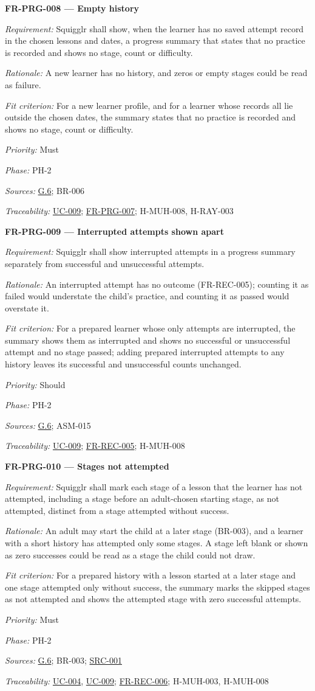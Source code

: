 \documentclass[12pt]{article}
\renewcommand{\_}{\textunderscore\allowbreak}%
\newcommand{\goalref}[1]{\hyperref[goal:#1]{G.#1}}
\newcommand{\ucref}[1]{\hyperref[uc:#1]{\mbox{UC-#1}}}
\newenvironment{srsrequirement}[2]{%
  \par\medskip\noindent\phantomsection\label{req:#1}%
  \textbf{#1 --- #2}\par\nobreak\smallskip }{\par\medskip}
\newcommand{\reqfield}[2]{\noindent\textit{#1:} #2\par}
\newcommand{\reqshall}[1]{\reqfield{Requirement}{#1}}
\newcommand{\reqrationale}[1]{\reqfield{Rationale}{#1}}
\newcommand{\reqfit}[1]{\reqfield{Fit criterion}{#1}}
\newcommand{\reqpriority}[1]{\reqfield{Priority}{#1}}
\newcommand{\reqphase}[1]{\reqfield{Phase}{#1}}
\newcommand{\reqsources}[1]{\reqfield{Sources}{#1}}
\newcommand{\reqtraces}[1]{\reqfield{Traceability}{#1}}
\newcommand{\reqref}[1]{\hyperref[req:#1]{#1}}
\newcommand{\srcref}[1]{\hyperref[src:#1]{SRC-#1}}
\providecommand{\ucref}[1]{\hyperref[uc:#1]{UC-#1}}
\begin{document}
\begin{srsrequirement}{FR-PRG-008}{Empty history}
  \reqshall{Squigglr shall show, when the learner has no saved attempt record in
the chosen lessons and dates, a progress summary that states that no practice is
recorded and shows no stage, count or difficulty.} \reqrationale{A new learner
has no history, and zeros or empty stages could be read as failure.} \reqfit{For
a new learner profile, and for a learner whose records all lie outside the
chosen dates, the summary states that no practice is recorded and shows no
stage, count or difficulty.}
  \reqpriority{Must}
  \reqphase{PH-2}
  \reqsources{\goalref{6}; BR-006} \reqtraces{\ucref{009}; \reqref{FR-PRG-007};
  H-MUH-008, H-RAY-003}
\end{srsrequirement}

\begin{srsrequirement}{FR-PRG-009}{Interrupted attempts shown apart}
  \reqshall{Squigglr shall show interrupted attempts in a progress summary
separately from successful and unsuccessful attempts.} \reqrationale{An
interrupted attempt has no outcome (FR-REC-005); counting it as failed would
understate the child's practice, and counting it as passed would overstate it.}
\reqfit{For a prepared learner whose only attempts are interrupted, the summary
shows them as interrupted and shows no successful or unsuccessful attempt and no
stage passed; adding prepared interrupted attempts to any history leaves its
successful and unsuccessful counts unchanged.}
  \reqpriority{Should}
  \reqphase{PH-2}
  \reqsources{\goalref{6}; ASM-015} \reqtraces{\ucref{009}; \reqref{FR-REC-005};
  H-MUH-008}
\end{srsrequirement}

\begin{srsrequirement}{FR-PRG-010}{Stages not attempted}
  \reqshall{Squigglr shall mark each stage of a lesson that the learner has not
attempted, including a stage before an adult-chosen starting stage, as not
attempted, distinct from a stage attempted without success.} \reqrationale{An
adult may start the child at a later stage (BR-003), and a learner with a short
history has attempted only some stages. A stage left blank or shown as zero
successes could be read as a stage the child could not draw.} \reqfit{For a
prepared history with a lesson started at a later stage and one stage attempted
only without success, the summary marks the skipped stages as not attempted and
shows the attempted stage with zero successful attempts.}
  \reqpriority{Must}
  \reqphase{PH-2}
  \reqsources{\goalref{6}; BR-003; \srcref{001}} \reqtraces{\ucref{004},
  \ucref{009}; \reqref{FR-REC-006}; H-MUH-003, H-MUH-008}
\end{srsrequirement}
\end{document}
